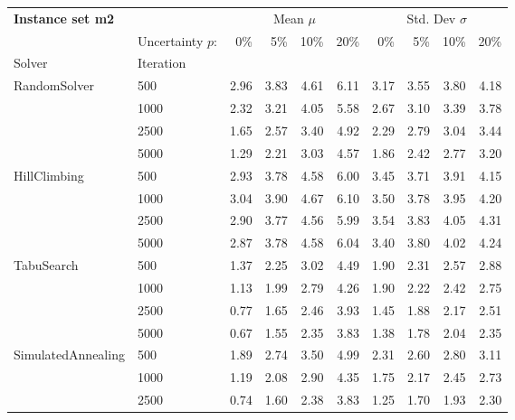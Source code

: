 \vspace*{-25px}
\begin{figure}[H]
\end{figure}

{\footnotesize
\begin{longtable}{ll|rrrr|rrrr}
\toprule
\textbf{Instance set m2}                 & {} & \multicolumn{4}{c|}{Mean $\mu$} & \multicolumn{4}{c}{Std. Dev $\sigma$} \\
                & Uncertainty $p$: & 0\% & 5\% & 10\% & 20\% & 0\% & 5\% & 10\% & 20\% \\
Solver & Iteration &      &      &      &      &      &      &      &      \\
\midrule
RandomSolver & 500  & 2.96 & 3.83 & 4.61 & 6.11 & 3.17 & 3.55 & 3.80 & 4.18 \\
                 & 1000 & 2.32 & 3.21 & 4.05 & 5.58 & 2.67 & 3.10 & 3.39 & 3.78 \\
                 & 2500 & 1.65 & 2.57 & 3.40 & 4.92 & 2.29 & 2.79 & 3.04 & 3.44 \\
                 & 5000 & 1.29 & 2.21 & 3.03 & 4.57 & 1.86 & 2.42 & 2.77 & 3.20 \\ \hline
HillClimbing & 500  & 2.93 & 3.78 & 4.58 & 6.00 & 3.45 & 3.71 & 3.91 & 4.15 \\
                 & 1000 & 3.04 & 3.90 & 4.67 & 6.10 & 3.50 & 3.78 & 3.95 & 4.20 \\
                 & 2500 & 2.90 & 3.77 & 4.56 & 5.99 & 3.54 & 3.83 & 4.05 & 4.31 \\
                 & 5000 & 2.87 & 3.78 & 4.58 & 6.04 & 3.40 & 3.80 & 4.02 & 4.24 \\ \hline
TabuSearch & 500  & 1.37 & 2.25 & 3.02 & 4.49 & 1.90 & 2.31 & 2.57 & 2.88 \\
                 & 1000 & 1.13 & 1.99 & 2.79 & 4.26 & 1.90 & 2.22 & 2.42 & 2.75 \\
                 & 2500 & 0.77 & 1.65 & 2.46 & 3.93 & 1.45 & 1.88 & 2.17 & 2.51 \\
                 & 5000 & 0.67 & 1.55 & 2.35 & 3.83 & 1.38 & 1.78 & 2.04 & 2.35 \\ \hline
SimulatedAnnealing & 500  & 1.89 & 2.74 & 3.50 & 4.99 & 2.31 & 2.60 & 2.80 & 3.11 \\
                 & 1000 & 1.19 & 2.08 & 2.90 & 4.35 & 1.75 & 2.17 & 2.45 & 2.73 \\
                 & 2500 & 0.74 & 1.60 & 2.38 & 3.83 & 1.25 & 1.70 & 1.93 & 2.30 \\

\end{longtable}}
